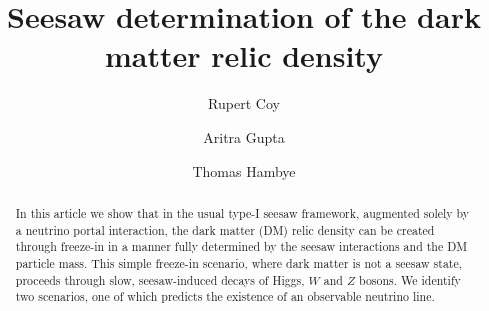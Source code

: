 \documentclass[prd,a4paper,twocolumn,preprintnumbers,nofootinbib,superscriptaddress]{revtex4}
\begin{document}
	
	\title{
		Seesaw determination of the dark matter relic density
	}
	
	\author{Rupert Coy}
	\author{Aritra Gupta}
	\author{Thomas Hambye}
	
	
\begin{abstract}
	In this article we show that in the usual type-I seesaw framework, augmented solely by a neutrino portal interaction, the dark matter (DM) relic density can be created through freeze-in in a manner fully determined by the seesaw interactions  and the DM particle mass. This simple freeze-in scenario, where dark matter is not a seesaw state, proceeds through slow, seesaw-induced decays of Higgs, $W$ and $Z$ bosons. We identify two scenarios, one of which predicts the existence of an observable neutrino line. 
	\end{abstract}
	
\end{document}
